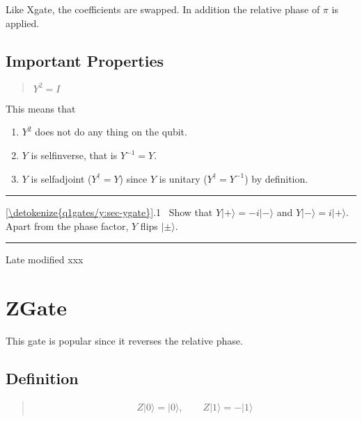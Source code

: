 \documentclass[letterpaper,10pt,english]{jupyterBook}
\begin{document}
\sphinxAtStartPar
Like Xgate, the coefficients are swapped.  In addition the relative phase of \(\pi\) is applied.


\subsection{Important Properties}
\label{\detokenize{q1gates/y:important-properties}}\begin{quote}

\sphinxAtStartPar
\(Y^2 = I\)
\end{quote}

\sphinxAtStartPar
This means that
\begin{enumerate}
%
\item {}
\sphinxAtStartPar
\(Y^2\) does not do any thing on the qubit.

\item {}
\sphinxAtStartPar
\(Y\) is  self\sphinxhyphen{}inverse, that is \(Y^{-1} = Y\).

\item {}
\sphinxAtStartPar
\(Y\) is self\sphinxhyphen{}adjoint (\(Y^\dagger = Y\)) since \(Y\) is unitary (\(Y^\dagger = Y^{-1}\)) by definition.

\end{enumerate}


\bigskip\hrule\bigskip


\sphinxAtStartPar
{} \hyperref[\detokenize{q1gates/y:sec-ygate}]{\ref{\detokenize{q1gates/y:sec-ygate}}}.1   Show that \(Y|+\rangle = -i |-\rangle\) and \(Y|-\rangle = i |+\rangle\).
Apart from the phase factor, \(Y\) flips \(|\pm\rangle\).


\bigskip\hrule\bigskip


\sphinxAtStartPar
Late modified xxx

\sphinxstepscope


\section{ZGate}
\label{\detokenize{q1gates/z:zgate}}\label{\detokenize{q1gates/z:sec-zgate}}\label{\detokenize{q1gates/z::doc}}
\sphinxAtStartPar
This gate is popular since it reverses the relative phase.

\sphinxAtStartPar
{}


\subsection{Definition}
\label{\detokenize{q1gates/z:definition}}
\sphinxAtStartPar
{}
\begin{quote}
\begin{equation*}
\begin{split}
Z |0\rangle = |0\rangle, \qquad Z |1\rangle = -|1\rangle
\end{split}
\end{equation*}\end{quote}
\end{document}
